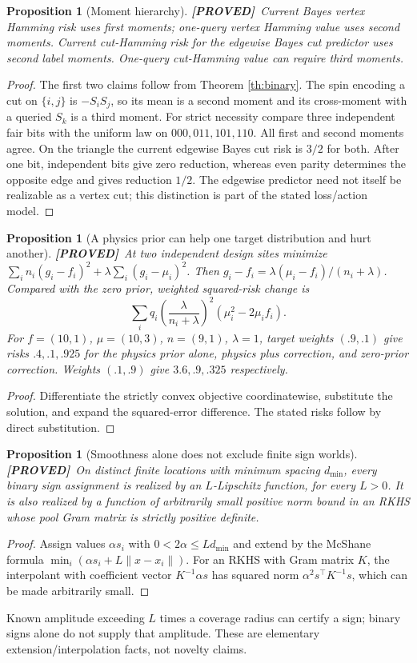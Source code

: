 \documentclass[11pt]{article}
\newtheorem{proposition}[theorem]{Proposition}
\theoremstyle{definition}
\newcommand{\1}{\mathbf 1}
\newcommand{\pr}{\textbf{[PROVED]}}
\begin{document}
\begin{proposition}[Moment hierarchy]\label{prop:hierarchy}
\pr\ Current Bayes vertex Hamming risk uses first moments; one-query vertex
Hamming value uses second moments. Current cut-Hamming risk for the
edgewise Bayes cut predictor uses second label moments. One-query
cut-Hamming value can require third moments.
\end{proposition}
\begin{proof}
The first two claims follow from Theorem \ref{th:binary}.
The spin encoding a cut on $\{i,j\}$ is $-S_iS_j$, so its mean is a second
moment and its cross-moment with a queried $S_k$ is a third moment.
For strict necessity compare three independent fair bits with the uniform
law on $000,011,101,110$. All first and second moments agree.
On the triangle the current edgewise Bayes cut risk is $3/2$ for both.
After one bit, independent bits give zero reduction, whereas even parity
determines the opposite edge and gives reduction $1/2$.
The edgewise predictor need not itself be realizable as a vertex cut;
this distinction is part of the stated loss/action model.
\end{proof}

\begin{proposition}[A physics prior can help one target distribution and hurt another]
\label{prop:physics}
\pr\ At two independent design sites minimize
$\sum_i n_i(g_i-f_i)^2+\lambda\sum_i(g_i-\mu_i)^2$.
Then $g_i-f_i=\lambda(\mu_i-f_i)/(n_i+\lambda)$.
Compared with the zero prior, weighted squared-risk change is
\[
 \sum_i q_i\left(\frac{\lambda}{n_i+\lambda}\right)^2
 (\mu_i^2-2\mu_if_i).
\]
For $f=(10,1)$, $\mu=(10,3)$, $n=(9,1)$, $\lambda=1$,
target weights $(.9,.1)$ give risks $.4,.1,.925$ for the physics prior alone,
physics plus correction, and zero-prior correction.
Weights $(.1,.9)$ give $3.6,.9,.325$ respectively.
\end{proposition}
\begin{proof}
Differentiate the strictly convex objective coordinatewise, substitute the
solution, and expand the squared-error difference.
The stated risks follow by direct substitution.
\end{proof}
\begin{proposition}[Smoothness alone does not exclude finite sign worlds]
\label{prop:smooth}
\pr\ On distinct finite locations with minimum spacing $d_{\min}$, every
binary sign assignment is realized by an $L$-Lipschitz function, for every
$L>0$. It is also realized by a function of arbitrarily small positive
norm bound in an RKHS whose pool Gram matrix is strictly positive definite.
\end{proposition}
\begin{proof}
Assign values $\alpha s_i$ with $0<2\alpha\le Ld_{\min}$ and extend by
the McShane formula $\min_i(\alpha s_i+L\|x-x_i\|)$.
For an RKHS with Gram matrix $K$, the interpolant with coefficient vector
$K^{-1}\alpha s$ has squared norm $\alpha^2s^\top K^{-1}s$, which can be
made arbitrarily small.
\end{proof}
Known amplitude exceeding $L$ times a coverage radius can certify a sign;
binary signs alone do not supply that amplitude. These are elementary
extension/interpolation facts, not novelty claims.
\end{document}
